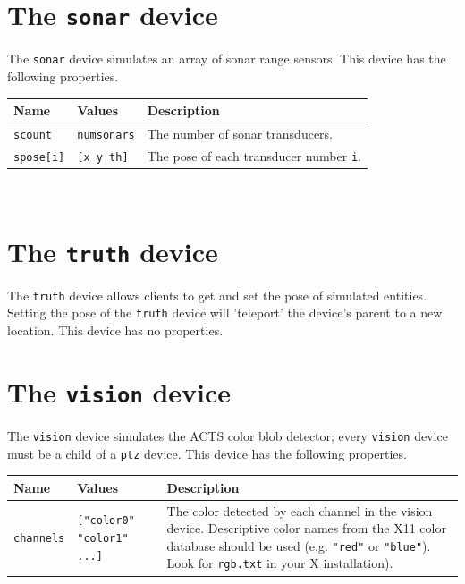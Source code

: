 \documentclass[11pt,twoside]{report}
\begin{document}
\newpage
\section{The {\tt sonar} device}

The {\tt sonar} device simulates an array of sonar range sensors.
This device has the following properties.
\vspace{1em}\\\noindent
\begin{tabularx}{\columnwidth}{llX}
\hline
Name & Values & Description \\
\hline

\verb'scount' & \verb'numsonars' & The number of sonar transducers.\\

\verb'spose[i]' & \verb'[x y th]' & The pose of each transducer number {\tt i}.\\

\hline
\end{tabularx}
\vspace{1em}\\


\newpage
\section{The {\tt truth} device}

The {\tt truth} device allows clients to get and set the pose of
simulated entities.  Setting the pose of the {\tt truth} device will
'teleport' the device's parent to a new location.
This device has no properties.


\newpage
\section{The {\tt vision} device}

The {\tt vision} device simulates the ACTS color blob detector; every
{\tt vision} device must be a child of a {\tt ptz} device.
This device has the following properties.
\vspace{1em}\\\noindent
\begin{tabularx}{\columnwidth}{llX}
\hline
Name & Values & Description \\
\hline

\verb'channels' & \verb'["color0" "color1" ...]' & The
color detected by each channel in the vision device.  Descriptive
color names from the X11 color database should be used
(e.g. \verb'"red"' or \verb'"blue"').  Look for \verb'rgb.txt' in your
X installation).\\

\hline
\end{tabularx}
\vspace{1em}\\




\end{document}
